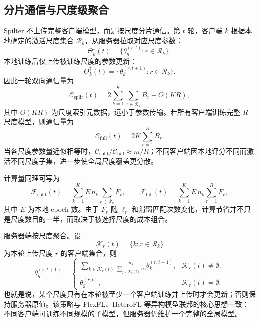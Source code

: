 \documentclass{article}
\begin{document}
\subsection{分片通信与尺度级聚合}

Spilter 不上传完整客户端模型，而是按尺度分片通信。第 $t$ 轮，客户端 $k$ 根据本地确定的激活尺度集合 $\mathcal{R}_k$，从服务器拉取对应尺度参数：
\begin{equation}
\Theta_{k}^{\downarrow}(t)=\{\theta_g^{(r,t)}:r\in\mathcal{R}_k\},
\end{equation}
本地训练后仅上传被训练尺度的参数更新：
\begin{equation}
\Theta_{k}^{\uparrow}(t)=\{\theta_k^{(r,t+1)}:r\in\mathcal{R}_k\}.
\end{equation}
因此一轮双向通信量为
\begin{equation}
\mathcal{C}_{\mathrm{split}}(t)
=2\sum_{k=1}^{K}\sum_{r\in\mathcal{R}_k}B_r + O(KR),
\end{equation}
其中 $O(KR)$ 为尺度索引元数据，远小于参数传输。若所有客户端训练完整 $R$ 尺度模型，则通信量为
\begin{equation}
\mathcal{C}_{\mathrm{full}}(t)
=2K\sum_{r=1}^{R}B_r.
\end{equation}
当各尺度参数量近似相等时，$\mathcal{C}_{\mathrm{split}}/\mathcal{C}_{\mathrm{full}}\approx m/R$；不同客户端因本地评分不同而激活不同尺度子集，进一步使全局尺度覆盖更分散。

计算量同理可写为
\begin{equation}
\mathcal{F}_{\mathrm{split}}(t)
=\sum_{k=1}^{K}E\,n_k\sum_{r\in\mathcal{R}_k}F_r,
\qquad
\mathcal{F}_{\mathrm{full}}(t)
=\sum_{k=1}^{K}E\,n_k\sum_{r=1}^{R}F_r,
\end{equation}
其中 $E$ 为本地 epoch 数。由于 $F_r$ 随 $\ell_r$ 和滑窗匹配次数变化，计算节省并不只是尺度数目的一半，而取决于被选择尺度的成本组合。

服务器端按尺度聚合。设
\begin{equation}
\mathcal{K}_r(t)=\{k:r\in\mathcal{R}_k\}
\end{equation}
为本轮上传尺度 $r$ 的客户端集合，则
\begin{equation}
\theta_g^{(r,t+1)}=
\begin{cases}
\displaystyle
\sum_{k\in\mathcal{K}_r(t)}
\frac{n_k}{\sum_{j\in\mathcal{K}_r(t)}n_j}
\theta_k^{(r,t+1)}, & \mathcal{K}_r(t)\neq\emptyset,\\[2ex]
\theta_g^{(r,t)}, & \mathcal{K}_r(t)=\emptyset.
\end{cases}
\label{eq:scale-agg}
\end{equation}
也就是说，某个尺度只有在本轮被至少一个客户端训练并上传时才会更新；否则保持服务器原值。该策略与 FlexFL、HeteroFL 等异构模型联邦的核心思想一致：不同客户端可训练不同规模的子模型，但服务器仍维护一个完整的全局模型\cite{heterofl,flexfl}。
\end{document}
